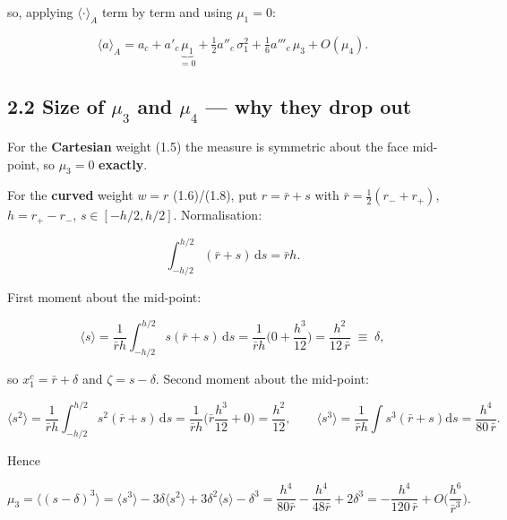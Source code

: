 \documentclass[11pt,a4paper]{article}
\begin{document}
so, applying $\langle\cdot\rangle_A$ term by term and using $\mu_1=0$:

\begin{equation*}
\langle a\rangle_A
= a_c + a'_c\underbrace{\mu_1}_{=0} + \tfrac12 a''_c\,\sigma_1^2
+ \tfrac16 a'''_c\,\mu_3 + O(\mu_4).
\tag{2.1}
\end{equation*}

\subsection*{2.2 Size of $\mu_3$ and $\mu_4$ — why they drop out}

For the \textbf{Cartesian} weight (1.5) the measure is symmetric about the face
mid-point, so $\mu_3=0$ \textbf{exactly}.

For the \textbf{curved} weight $w=r$ (1.6)/(1.8), put $r=\bar r+s$ with
$\bar r=\tfrac12(r_-+r_+)$, $h=r_+-r_-$, $s\in[-h/2,h/2]$. Normalisation:

\begin{equation*}
\int_{-h/2}^{h/2}(\bar r+s)\,\mathrm{d}s = \bar r h .
\end{equation*}

First moment about the mid-point:

\begin{equation*}
\langle s\rangle = \frac{1}{\bar r h}\int_{-h/2}^{h/2}s(\bar r+s)\,\mathrm{d}s
= \frac{1}{\bar r h}\Big(0 + \frac{h^3}{12}\Big)
= \frac{h^2}{12\,\bar r}\;\equiv\;\delta ,
\tag{2.2}
\end{equation*}

so $x_1^c = \bar r+\delta$ and $\zeta=s-\delta$. Second moment about the
mid-point:

\begin{equation*}
\langle s^2\rangle = \frac{1}{\bar r h}\int_{-h/2}^{h/2}s^2(\bar r+s)\,\mathrm{d}s
= \frac{1}{\bar r h}\Big(\bar r\frac{h^3}{12}+0\Big) = \frac{h^2}{12},
\qquad
\langle s^3\rangle = \frac{1}{\bar r h}\int s^3(\bar r+s)\mathrm{d}s
= \frac{h^4}{80\,\bar r}.
\end{equation*}

Hence

\begin{equation*}
\mu_3 = \langle(s-\delta)^3\rangle
= \langle s^3\rangle - 3\delta\langle s^2\rangle + 3\delta^2\langle s\rangle-\delta^3
= \frac{h^4}{80\bar r} - \frac{h^4}{48\bar r} + 2\delta^3
= -\frac{h^4}{120\,\bar r} + O\!\Big(\frac{h^6}{\bar r^3}\Big).
\tag{2.3}
\end{equation*}
\end{document}
